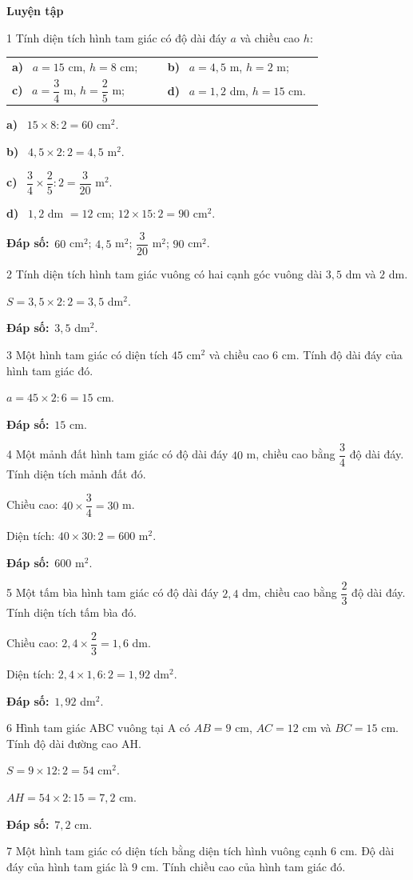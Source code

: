 \documentclass[11pt]{article}
\makeatletter
\newif\ifsol \solfalse
\renewcommand{\arraystretch}{1.35}
\providecommand{\AnsWord}{Đáp số}
\newcommand{\dapso}[1]{\par\textbf{\AnsWord:}\ #1}
\newcommand{\probsol}[1]{%
  \begin{lrbox}{\solmeasure}\begin{minipage}{\dimexpr\linewidth-24pt\relax}#1\end{minipage}\end{lrbox}%
  \ifsol
    \begin{solbox}#1\end{solbox}%
  \else
    \setlength{\solht}{\dimexpr\ht\solmeasure+\dp\solmeasure+0.85cm\relax}%
    \ifdim\solht<1.35cm\setlength{\solht}{1.35cm}\fi
    \begin{tcolorbox}[colback=white,colframe=Line,boxrule=0.8pt,arc=5pt,
      left=8pt,right=8pt,top=4pt,bottom=4pt,height=\solht]{\footnotesize\color{Slate}\itshape\WorkWord}\end{tcolorbox}%
  \fi}
\newcommand{\dividerbar}[1]{\par\vspace{0.6em}\noindent
  \begin{tcolorbox}[enhanced,frame hidden,interior hidden,borderline west={5pt}{0pt}{ProbBlue},
    colback=white,left=12pt,right=12pt,top=5pt,bottom=5pt,arc=4pt]
  {\large\bfseries\color{ProbBlue} #1}\end{tcolorbox}\vspace{0.4em}}
\newcommand{\pa}[1]{\textbf{#1)}\ }
\newenvironment{cols2}{\par\vspace{3pt}\noindent\setlength{\tabcolsep}{0pt}\renewcommand{\arraystretch}{1.3}%
  \begin{tabular}{@{}>{\raggedright\arraybackslash\rule{0pt}{4.4ex}}p{0.48\linewidth}<{\rule[-2.3ex]{0pt}{0pt}}@{\hspace{0.03\linewidth}}>{\raggedright\arraybackslash\rule{0pt}{4.4ex}}p{0.48\linewidth}<{\rule[-2.3ex]{0pt}{0pt}}@{}}}%
  {\end{tabular}\par}
\newcommand{\gap}{\vspace{0.3cm}}
\def\WorkWord{Bài làm:}
\def\AnsWord{Đáp số}
\makeatother
\begin{document}
\dividerbar{Luyện tập}
\begin{probbox}{1}{\relax}
Tính diện tích hình tam giác có độ dài đáy $a$ và chiều cao $h$:
\begin{cols2}
\pa{a} $a=15$ cm, $h=8$ cm; & \pa{b} $a=4{,}5$ m, $h=2$ m;\\
\pa{c} $a=\dfrac34$ m, $h=\dfrac25$ m; & \pa{d} $a=1{,}2$ dm, $h=15$ cm.
\end{cols2}
\end{probbox}
\probsol{
\pa{a} $15\times8:2=60$ cm$^2$.\par \pa{b} $4{,}5\times2:2=4{,}5$ m$^2$.\par \pa{c} $\dfrac34\times\dfrac25:2=\dfrac3{20}$ m$^2$.\par \pa{d} $1{,}2$ dm $=12$ cm; $12\times15:2=90$ cm$^2$.
\dapso{$60$ cm$^2$; $4{,}5$ m$^2$; $\dfrac3{20}$ m$^2$; $90$ cm$^2$.}}
\gap
\begin{probbox}{2}{\relax}
Tính diện tích hình tam giác vuông có hai cạnh góc vuông dài $3{,}5$ dm và $2$ dm.
\end{probbox}
\probsol{
$S=3{,}5\times2:2=3{,}5$ dm$^2$.
\dapso{$3{,}5$ dm$^2$.}}
\gap
\begin{probbox}{3}{\relax}
Một hình tam giác có diện tích $45$ cm$^2$ và chiều cao $6$ cm. Tính độ dài đáy của hình tam giác đó.
\end{probbox}
\probsol{
$a=45\times2:6=15$ cm.
\dapso{$15$ cm.}}
\gap
\begin{probbox}{4}{\relax}
Một mảnh đất hình tam giác có độ dài đáy $40$ m, chiều cao bằng $\dfrac34$ độ dài đáy. Tính diện tích mảnh đất đó.
\end{probbox}
\probsol{
Chiều cao: $40\times\dfrac34=30$ m.\par Diện tích: $40\times30:2=600$ m$^2$.
\dapso{$600$ m$^2$.}}
\gap
\begin{probbox}{5}{\relax}
Một tấm bìa hình tam giác có độ dài đáy $2{,}4$ dm, chiều cao bằng $\dfrac23$ độ dài đáy. Tính diện tích tấm bìa đó.
\end{probbox}
\probsol{
Chiều cao: $2{,}4\times\dfrac23=1{,}6$ dm.\par Diện tích: $2{,}4\times1{,}6:2=1{,}92$ dm$^2$.
\dapso{$1{,}92$ dm$^2$.}}
\gap
\begin{probbox}{6}{\relax}
Hình tam giác ABC vuông tại A có $AB=9$ cm, $AC=12$ cm và $BC=15$ cm. Tính độ dài đường cao AH.
\end{probbox}
\probsol{
$S=9\times12:2=54$ cm$^2$.\par $AH=54\times2:15=7{,}2$ cm.
\dapso{$7{,}2$ cm.}}
\gap
\begin{probbox}{7}{\relax}
Một hình tam giác có diện tích bằng diện tích hình vuông cạnh $6$ cm. Độ dài đáy của hình tam giác là $9$ cm. Tính chiều cao của hình tam giác đó.
\end{probbox}
\end{document}
